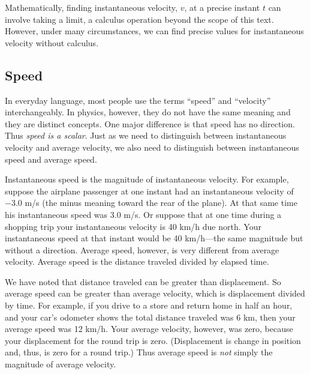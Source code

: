 \documentclass[
]{book}
\begin{document}
Mathematically, finding instantaneous velocity, \(v{}\), at a precise
instant \(t{}\) can involve taking a limit, a calculus operation beyond
the scope of this text. However, under many circumstances, we can find
precise values for instantaneous velocity without calculus.

\hypertarget{fs-id3597726}{}
\hypertarget{speed}{%
\subsection{Speed}\label{speed}}

In everyday language, most people use the terms ``speed'' and ``velocity''
interchangeably. In physics, however, they do not have the same meaning
and they are distinct concepts. One major difference is that speed has
no direction. Thus \emph{speed is a scalar}. Just as we need to distinguish
between instantaneous velocity and average velocity, we also need to
distinguish between instantaneous speed and average speed.

\protect\hypertarget{import-auto-id2004213}{}{Instantaneous speed} is the
magnitude of instantaneous velocity. For example, suppose the airplane
passenger at one instant had an instantaneous velocity of −3.0 m/s (the
minus meaning toward the rear of the plane). At that same time his
instantaneous speed was 3.0 m/s. Or suppose that at one time during a
shopping trip your instantaneous velocity is 40 km/h due north. Your
instantaneous speed at that instant would be 40 km/h---the same
magnitude but without a direction. Average speed, however, is very
different from average velocity. \protect\hypertarget{import-auto-id2004216}{}{Average speed} is the distance traveled divided by elapsed time.

We have noted that distance traveled can be greater than displacement.
So average speed can be greater than average velocity, which is
displacement divided by time. For example, if you drive to a store and
return home in half an hour, and your car's odometer shows the total
distance traveled was 6 km, then your average speed was 12 km/h. Your
average velocity, however, was zero, because your displacement for the
round trip is zero. (Displacement is change in position and, thus, is
zero for a round trip.) Thus average speed is \emph{not} simply the magnitude
of average velocity.
\end{document}
